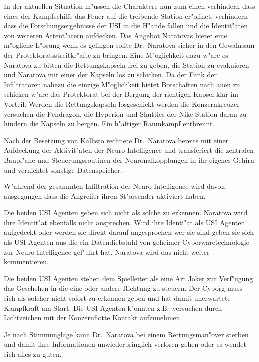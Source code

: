 In der aktuellen Situation m"ussen die Charaktere nun zum einen verhindern dass eines der Kampfschiffe das Feuer auf die treibende Station er"offnet, verhindern dass die Forschungsergebnisse der USI in die H"ande fallen und die Identit"aten von weiteren Attent"atern aufdecken. Das Angebot Naratovas bietet eine m"ogliche L"osung wenn es gelingen sollte Dr.~Naratova sicher in den Gewahrsam der Protektoratsstreitkr"afte zu bringen. Eine M"oglichkeit dazu w"are es Naratova zu bitten die Rettungskapseln frei zu geben, die Station zu evakuieren und Naratova mit einer der Kapseln los zu schicken. Da der Funk der Infiltratoren nahezu die einzige M"oglichkeit bietet Botschaften nach au\3en zu schicken w"are das Protektorat bei der Bergung der richtigen Kapsel klar im Vorteil. Werden die Rettungskapseln losgeschickt werden die Konzernkreuzer versuchen die Pendragon, die Hyperion und Shuttles der Nike Station daran zu hindern die Kapseln zu bergen. Ein h"aftiger Raumkampf entbrennt.

\begin{remarks}
Nach der Besetzung von Kallisto rechnete Dr.~Naratova bereits mit einer Aufdeckung der Aktivit"aten der Neuro Intelligence und transferiert die zentralen Baupl"ane und Steuerungsroutinen der Neuronalkopplungen in ihr eigenes Gehirn und vernichtet sonstige Datenspeicher.

W"ahrend der gesammten Infiltration der Neuro Intelligence wird davon ausgegangen dass die Angreifer ihren St"orsender aktiviert haben.

Die beiden USI Agenten geben sich nicht als solche zu erkennen. Naratova wird ihre Identit"at ebenfalls nicht ansprechen. Wird ihre Identi"at als USI Agenten aufgedeckt oder werden sie direkt darauf angesprochen wer sie sind geben sie sich als USI Agenten aus die ein Datendiebstahl von geheimer Cyberwaretechnologie zur Neuro Intelligence gef"uhrt hat. Naratova wird das nicht weiter kommentieren.

Die beiden USI Agenten stehen dem Spielleiter als eine Art Joker zur Verf"ugung das Geschehen in die eine oder andere Richtung zu steuern. Der Cyborg muss sich als solcher nicht sofort zu erkennen geben und hat damit unerwartete Kampfkraft am Start. Die USI Agenten k"onnten z.B.~versuchen durch Lichtzeichen mit der Konzernflotte Kontakt aufzunehmen.

Je nach Stimmunglage kann Dr.~Naratova bei einem Rettungsman"over sterben und damit ihre Informationen unwiederbringlich verloren gehen oder es wendet sich alles zu guten.
\end{remarks}
